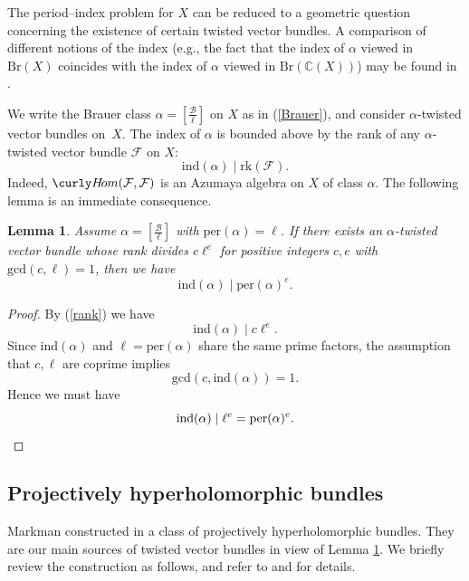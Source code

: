 \documentclass[11pt]{amsart}
\theoremstyle{plain}
\newtheorem{lem}[thm]{Lemma}
\theoremstyle{definition}
\theoremstyle{remark}
\newcommand{\CB}{{\mathcal B}}
\newcommand{\CF}{{\mathcal F}}
\renewcommand\hom{\curly H\!om}
\begin{document}
The period--index problem for $X$ can be reduced to a geometric question concerning the existence of certain twisted vector bundles.
A comparison of different notions of the index (e.g., the fact that the index of $\alpha$ viewed in $\mathrm{Br}(X)$ coincides with the index of $\alpha$ viewed in $\mathrm{Br}(\mathbb{C}(X))$) may be found in \cite{dJP}.

We write the Brauer class $\alpha = \left[\frac{\CB}{\ell} \right]$ on $X$ as in (\ref{Brauer}), and consider $\alpha$-twisted vector bundles on~$X$. The index of $\alpha$ is bounded above by the rank of any $\alpha$-twisted vector bundle $\CF$ on $X$:
\begin{equation}\label{rank}
\mathrm{ind}(\alpha) \mid \mathrm{rk}(\CF).
\end{equation}
Indeed, $\hom(\CF, \CF)$ is an Azumaya algebra on $X$ of class $\alpha$.
The following lemma is an immediate consequence.

\begin{lem}\label{lem1.1}
Assume $\alpha = \left[\frac{\CB}{\ell} \right]$ with $\mathrm{per}(\alpha) = \ell$. If there exists an $\alpha$-twisted vector bundle whose rank divides $c \ell^e$ for positive integers $c,e$ with $\mathrm{gcd}(c,\ell)=1$, then we have
\[
\mathrm{ind}(\alpha) \mid \mathrm{per}(\alpha)^e.
\]
\end{lem}

\begin{proof}
By (\ref{rank}) we have
\[
\mathrm{ind}(\alpha) \mid c\ell^e.
\]
Since $\mathrm{ind}(\alpha)$ and $\ell = \mathrm{per}(\alpha)$ share the same prime factors, the assumption that $c, \ell$ are coprime implies 
\[
\mathrm{gcd}(c, \mathrm{ind}(\alpha)) = 1.
\]
Hence we must have
\[
\mathrm{ind}(\alpha) \mid \ell^e = \mathrm{per}(\alpha)^e. \qedhere
\]
\end{proof}


\subsection{Projectively hyperholomorphic bundles} Markman constructed in \cite{Markman} a class of projectively hyperholomorphic bundles. They are our main sources of twisted vector bundles in view of Lemma \ref{lem1.1}. We briefly review the construction as follows, and refer to \cite{Markman} and \cite{MSYZ} for details. 
\end{document}
